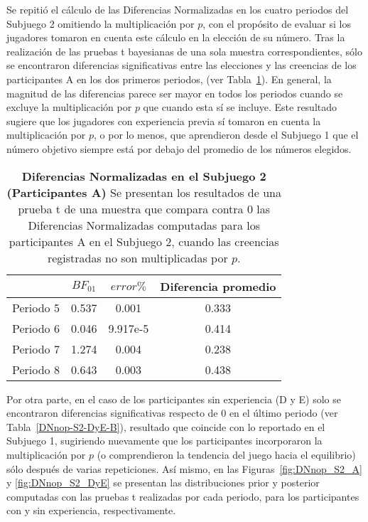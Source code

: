 Se repitió el cálculo de las Diferencias Normalizadas en los cuatro periodos del Subjuego 2 omitiendo la multiplicación por $p$, con el propósito de evaluar si los jugadores tomaron en cuenta este cálculo en la elección de su número. Tras la realización de las pruebas t bayesianas de una sola muestra correspondientes,  sólo se encontraron diferencias significativas entre las elecciones y las creencias de los participantes A en los dos primeros  periodos, (ver Tabla~\ref{DNnop-S2-A-B}). En general, la magnitud de las diferencias parece ser mayor en todos los periodos cuando se excluye la multiplicación por $p$ que cuando esta sí se incluye. Este resultado sugiere que los jugadores con experiencia previa sí tomaron en cuenta la multiplicación por $p$, o por lo menos, que aprendieron desde el Subjuego 1 que el número objetivo siempre está por debajo del promedio de los números elegidos.\\

\begin{table}[h]
\caption[Diferencias Normalizadas en el Subjuego 2 omitiendo la multiplicación por $p$; Participante A (Pruebas t de una muestra)]{\textbf{Diferencias Normalizadas en el Subjuego 2 (Participantes A)} Se presentan los resultados de una prueba t de una muestra que compara contra 0 las Diferencias Normalizadas computadas para los participantes A en el Subjuego 2, cuando las creencias registradas no son multiplicadas por $p$.}
\label{DNnop-S2-A-B}
\centering
\begin{tabular}{l | c c | c}
\toprule
\textbf{} & \textbf{$BF_{01}$} & \textbf{$error\%$} & \textbf{Diferencia promedio}\\
\midrule
Periodo 5 & 0.537 & 0.001 & 0.333\\
Periodo 6 & 0.046 & 9.917e-5 & 0.414\\
Periodo 7 & 1.274 & 0.004 & 0.238\\
Periodo 8 & 0.643 & 0.003 & 0.438\\
\bottomrule
\end{tabular}
\end{table}

Por otra parte, en el caso de los participantes sin experiencia (D y E) solo se encontraron diferencias significativas respecto de 0 en el último periodo (ver Tabla~\ref{DNnop-S2-DyE-B}), resultado que coincide con lo reportado en el Subjuego 1, sugiriendo nuevamente que los participantes incorporaron la multiplicación por $p$ (o comprendieron la tendencia del juego hacia el equilibrio)  sólo después de varias repeticiones. Así mismo, en las Figuras~\ref{fig:DNnop_S2_A} y \ref{fig:DNnop_S2_DyE} se presentan las distribuciones prior y posterior computadas con las pruebas t realizadas por cada periodo, para los participantes con y sin experiencia, respectivamente.\\

